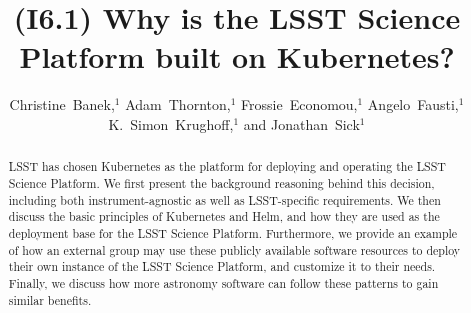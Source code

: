 \documentclass[11pt,twoside]{article}
\begin{document}
\title{(I6.1) Why is the LSST Science Platform built on Kubernetes?}


\author{Christine~Banek,$^1$ Adam~Thornton,$^1$ Frossie~Economou,$^1$ Angelo~Fausti,$^1$ K.~Simon~Krughoff,$^1$ and Jonathan~Sick$^1$}





\newcommand{\code}[1]{\texttt{#1}}

\begin{abstract}
LSST has chosen Kubernetes as the platform for deploying and
operating the LSST Science Platform.  We first present the
background reasoning behind this decision, including both
instrument-agnostic as well as LSST-specific requirements.
We then discuss the basic principles of Kubernetes and Helm, and how
they are used as the deployment base for the LSST Science Platform.
Furthermore, we provide an example of how an external group may
use these publicly available software resources to deploy their own
instance of the LSST Science Platform, and customize it
to their needs.  Finally, we discuss how more astronomy software
can follow these patterns to gain similar benefits.
\end{abstract}
\end{document}
